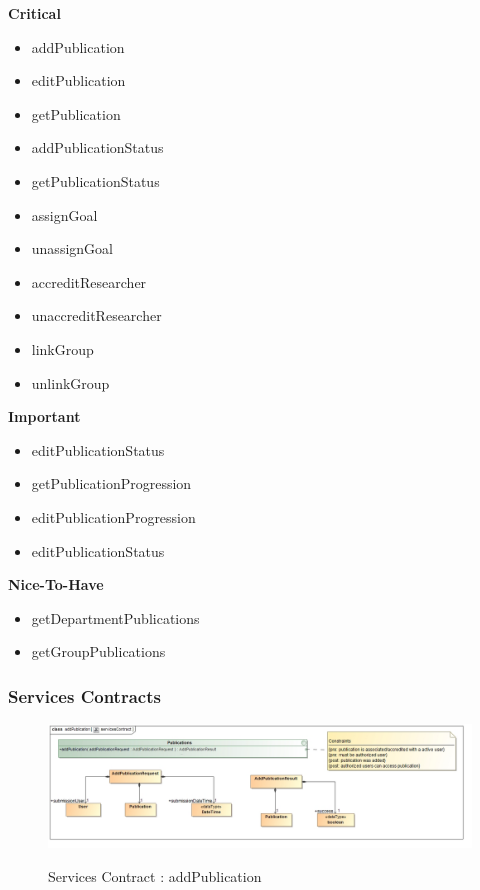 \documentclass{article}
\begin{document}
		\begin{flushleft}
			\textbf{Critical}
				\begin{itemize}
	  				\item addPublication
	  				\item editPublication
	  				\item getPublication
	  				\item addPublicationStatus
	  				\item getPublicationStatus
	  				\item assignGoal
	  				\item unassignGoal
	  				\item accreditResearcher
	  				\item unaccreditResearcher
	  				\item linkGroup
	  				\item unlinkGroup
				\end{itemize}

			\textbf{Important}
				\begin{itemize}
	  				\item editPublicationStatus
	  				\item getPublicationProgression
	  				\item editPublicationProgression
	  				\item editPublicationStatus
				\end{itemize}

			\textbf{Nice-To-Have}
				\begin{itemize}
	  				\item getDepartmentPublications
	  				\item getGroupPublications
				\end{itemize}
		\end{flushleft}

	\subsubsection{Services Contracts}
		\begin{figure}[H]
		\includegraphics[width=\textwidth]{Quinton_Diagrams/class__addPublication__servicesContract.jpg}  \\
		\caption{Services Contract : addPublication}
		\end{figure}
\end{document}
